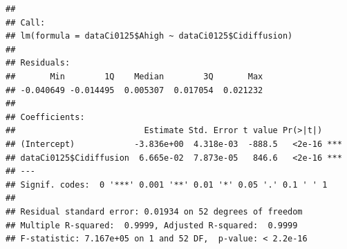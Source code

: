 \documentclass[
]{krantz}
\makeatletter
\newenvironment{Shaded}{\begin{snugshade}}{\end{snugshade}}
\newcommand{\CommentTok}[1]{\textcolor[rgb]{0.56,0.35,0.01}{\textit{#1}}}
\newcommand{\DecValTok}[1]{\textcolor[rgb]{0.00,0.00,0.81}{#1}}
\newcommand{\FunctionTok}[1]{\textcolor[rgb]{0.00,0.00,0.00}{#1}}
\newcommand{\NormalTok}[1]{#1}
\newcommand{\OtherTok}[1]{\textcolor[rgb]{0.56,0.35,0.01}{#1}}
\newcommand{\SpecialCharTok}[1]{\textcolor[rgb]{0.00,0.00,0.00}{#1}}
\newcommand{\StringTok}[1]{\textcolor[rgb]{0.31,0.60,0.02}{#1}}
\newenvironment{kframe}{%
\medskip{}
\setlength{\fboxsep}{.8em}
 \def\at@end@of@kframe{}%
 \ifinner\ifhmode%
  \def\at@end@of@kframe{\end{minipage}}%
  \begin{minipage}{\columnwidth}%
 \fi\fi%
 \def\FrameCommand##1{\hskip\@totalleftmargin \hskip-\fboxsep
 \colorbox{shadecolor}{##1}\hskip-\fboxsep
     \hskip-\linewidth \hskip-\@totalleftmargin \hskip\columnwidth}%
 \MakeFramed {\advance\hsize-\width
   \@totalleftmargin\z@ \linewidth\hsize
   \@setminipage}}%
 {\par\unskip\endMakeFramed%
 \at@end@of@kframe}
\renewenvironment{Shaded}{\begin{kframe}}{\end{kframe}}
\makeatother
\begin{document}
\begin{Shaded}
\end{Shaded}

\begin{verbatim}
## 
## Call:
## lm(formula = dataCi0125$Ahigh ~ dataCi0125$Cidiffusion)
## 
## Residuals:
##       Min        1Q    Median        3Q       Max 
## -0.040649 -0.014495  0.005307  0.017054  0.021232 
## 
## Coefficients:
##                          Estimate Std. Error t value Pr(>|t|)    
## (Intercept)            -3.836e+00  4.318e-03  -888.5   <2e-16 ***
## dataCi0125$Cidiffusion  6.665e-02  7.873e-05   846.6   <2e-16 ***
## ---
## Signif. codes:  0 '***' 0.001 '**' 0.01 '*' 0.05 '.' 0.1 ' ' 1
## 
## Residual standard error: 0.01934 on 52 degrees of freedom
## Multiple R-squared:  0.9999, Adjusted R-squared:  0.9999 
## F-statistic: 7.167e+05 on 1 and 52 DF,  p-value: < 2.2e-16
\end{verbatim}
\end{document}

